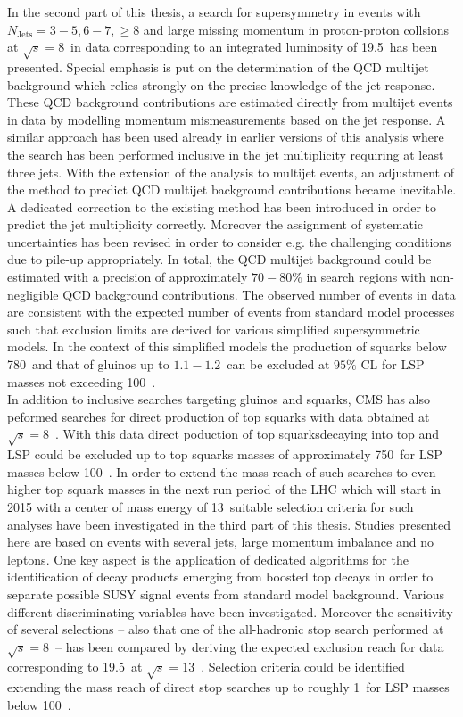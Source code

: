 In the second part of this thesis, a search for supersymmetry in events with $N_\mathrm{Jets} = 3-5, 6-7, \ge 8$ and large missing momentum in proton-proton collsions at $\sqrt{s}=8$~\tev in data corresponding to an integrated luminosity of 19.5~\fbinv has been presented. Special emphasis is put on the determination of the QCD multijet background which relies strongly on the precise knowledge of the jet response. These QCD background contributions are estimated directly from multijet events in data by modelling momentum mismeasurements based on the jet response. A similar approach has been used already in earlier versions of this analysis where the search has been performed inclusive in the jet multiplicity requiring at least three jets. With the extension of the analysis to multijet events, an adjustment of the method to predict QCD multijet background contributions became inevitable. A dedicated correction to the existing method has been introduced in order to predict the jet multiplicity correctly. Moreover the assignment of systematic uncertainties has been revised in order to consider e.g. the challenging conditions due to pile-up appropriately. In total, the QCD multijet background could be estimated with a precision of approximately $70-80 \%$ in search regions with non-negligible QCD background contributions. The observed number of events in data are consistent with the expected number of events from standard model processes such that exclusion limits are derived for various simplified supersymmetric models. In the context of this simplified models the production of squarks below 780~\gev and that of gluinos up to $1.1-1.2$~\tev can be excluded at $95\%$ CL for LSP masses not exceeding 100~\gev. \\
In addition to inclusive searches targeting gluinos and squarks, CMS has also peformed searches for direct production of top squarks with data obtained at $\sqrt{s}=8$~\tev. With this data direct poduction of top squarksdecaying into top and LSP could be excluded up to top squarks masses of approximately 750~\gev for LSP masses below 100~\gev. In order to extend the mass reach of such searches to even higher top squark masses in the next run period of the LHC which will start in 2015 with a center of mass energy of 13~\tev suitable selection criteria for such analyses have been investigated in the third part of this thesis. Studies presented here are based on events with several jets, large momentum imbalance and no leptons. One key aspect is the application of dedicated algorithms for the identification of decay products emerging from boosted top decays in order to separate possible SUSY signal events from standard model background. Various different discriminating variables have been investigated. Moreover the sensitivity of several selections -- also that one of the all-hadronic stop search performed at $\sqrt{s}=8$~\tev -- has been compared by deriving the expected exclusion reach for data corresponding to 19.5~\fbinv at $\sqrt{s}=13$~\tev. Selection criteria could be identified extending the mass reach of direct stop searches up to roughly 1~\tev for LSP masses below 100~\gev. 


